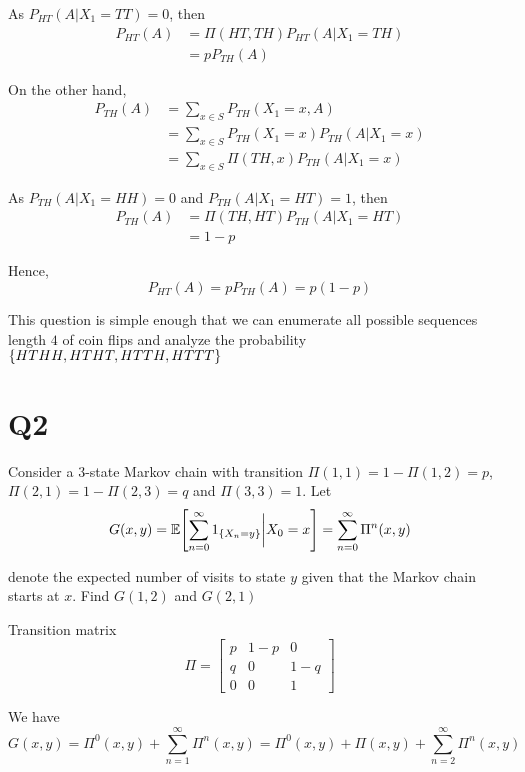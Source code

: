 \documentclass{article}
\begin{document}
As $P_{HT}(A | X_1=TT) = 0$, then
\begin{align*}
    P_{HT}(A)
    &= \Pi(HT, TH) P_{HT}(A | X_1=TH) \\
    &= p P_{TH}(A)
\end{align*}

On the other hand,
\begin{align*}
    P_{TH}(A)
    &= \sum_{x \in S} P_{TH}(X_1 = x, A) \\
    &= \sum_{x \in S} P_{TH}(X_1 = x) P_{TH}(A| X_1 = x) \\
    &= \sum_{x \in S} \Pi(TH, x) P_{TH}(A| X_1 = x)
\end{align*}

As $P_{TH}(A| X_1 = HH) = 0$ and $P_{TH}(A| X_1 = HT) = 1$, then
\begin{align*}
    P_{TH}(A)
    &= \Pi(TH, HT) P_{TH}(A| X_1 = HT) \\
    &= 1-p
\end{align*}

Hence,
$$
    P_{HT}(A) = p P_{TH}(A) = p(1-p)
$$

\begin{remark}
    This question is simple enough that we can enumerate all possible sequences length $4$ of coin flips and analyze the probability $\{HTHH, HTHT, HTTH, HTTT\}$
\end{remark}

\section{Q2}

Consider a $3$-state Markov chain with transition $\Pi(1, 1) = 1 - \Pi(1, 2) = p$, $\Pi(2, 1) = 1 - \Pi(2, 3) = q$ and $\Pi(3, 3) = 1$. Let
$$
    G(x, y) = \Exp\bracket*{\sum_{n=0}^\infty 1_{\set{X_n = y}} \bigg\vert X_0 = x} = \sum_{n=0}^\infty \Pi^n(x, y)
$$

denote the expected number of visits to state $y$ given that the Markov chain starts at $x$. Find $G(1, 2)$ and $G(2, 1)$

Transition matrix
$$
    \Pi = \begin{bmatrix}
        p & 1-p & 0 \\
        q & 0 & 1-q \\
        0 & 0 & 1
    \end{bmatrix}
$$

We have
$$
    G(x, y) = \Pi^0(x, y) + \sum_{n=1}^\infty \Pi^n(x, y) = \Pi^0(x, y) + \Pi(x, y) + \sum_{n=2}^\infty \Pi^n(x, y)
$$
\end{document}
